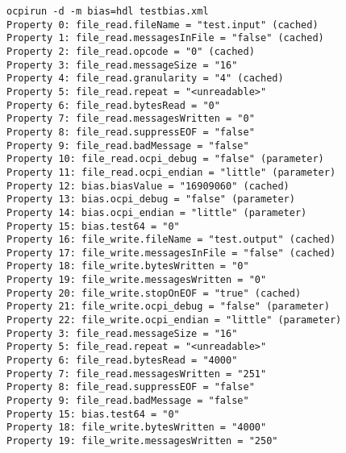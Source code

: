 \documentclass{article}
\newcommand{\terminaloutput}[1]{\texttt{#1}}
\begin{document}
\noindent\terminaloutput{ocpirun -d -m bias=hdl testbias.xml \\
Property  0: file\_read.fileName = "test.input" (cached)\\
Property  1: file\_read.messagesInFile = "false" (cached)\\
Property  2: file\_read.opcode = "0" (cached)\\
Property  3: file\_read.messageSize = "16"\\
Property  4: file\_read.granularity = "4" (cached)\\
Property  5: file\_read.repeat = "<unreadable>"\\
Property  6: file\_read.bytesRead = "0"\\
Property  7: file\_read.messagesWritten = "0"\\
Property  8: file\_read.suppressEOF = "false"\\
Property  9: file\_read.badMessage = "false"\\
Property 10: file\_read.ocpi\_debug = "false" (parameter)\\
Property 11: file\_read.ocpi\_endian = "little" (parameter)\\
Property 12: bias.biasValue = "16909060" (cached)\\
Property 13: bias.ocpi\_debug = "false" (parameter)\\
Property 14: bias.ocpi\_endian = "little" (parameter)\\
Property 15: bias.test64 = "0"\\
Property 16: file\_write.fileName = "test.output" (cached)\\
Property 17: file\_write.messagesInFile = "false" (cached)\\
Property 18: file\_write.bytesWritten = "0"\\
Property 19: file\_write.messagesWritten = "0"\\
Property 20: file\_write.stopOnEOF = "true" (cached)\\
Property 21: file\_write.ocpi\_debug = "false" (parameter)\\
Property 22: file\_write.ocpi\_endian = "little" (parameter)\\
Property  3: file\_read.messageSize = "16"\\
Property  5: file\_read.repeat = "<unreadable>"\\
Property  6: file\_read.bytesRead = "4000"\\
Property  7: file\_read.messagesWritten = "251"\\
Property  8: file\_read.suppressEOF = "false"\\
Property  9: file\_read.badMessage = "false"\\
Property 15: bias.test64 = "0"\\
Property 18: file\_write.bytesWritten = "4000"\\
Property 19: file\_write.messagesWritten = "250"\\
\\
}
\end{document}
